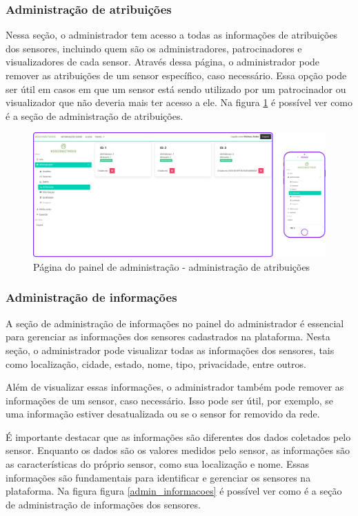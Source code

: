 \documentclass[tcc,capa]{texufpel}
\begin{document}
\subsubsection{Administração de atribuições}
Nessa seção, o administrador tem acesso a todas as informações de atribuições dos sensores, incluindo quem são os administradores, patrocinadores e visualizadores de cada sensor.
Através dessa página, o administrador pode remover as atribuições de um sensor específico, caso necessário. Essa opção pode ser útil em casos em que um sensor está sendo utilizado por um patrocinador ou visualizador que não deveria mais ter acesso a ele. Na figura \ref{adminatrib} é possível ver como é a seção de administração de atribuições.
\begin{figure}[htbp]
  \centering \includegraphics[scale=.2]{assets/painelatribuicao.png}
  \caption{Página do painel de administração - administração de atribuições}
  \label{adminatrib}
\end{figure}
\subsubsection{Administração de informações}
A seção de administração de informações no painel do administrador é essencial para gerenciar as informações dos sensores cadastrados na plataforma. Nesta seção, o administrador pode visualizar todas as informações dos sensores, tais como localização, cidade, estado, nome, tipo, privacidade, entre outros.

Além de visualizar essas informações, o administrador também pode remover as informações de um sensor, caso necessário. Isso pode ser útil, por exemplo, se uma informação estiver desatualizada ou se o sensor for removido da rede.

É importante destacar que as informações são diferentes dos dados coletados pelo sensor. Enquanto os dados são os valores medidos pelo sensor, as informações são as características do próprio sensor, como sua localização e nome. Essas informações são fundamentais para identificar e gerenciar os sensores na plataforma. Na figura figura \ref{admin_informacoes} é possível ver como é a seção de administração de informações dos sensores.
\end{document}

